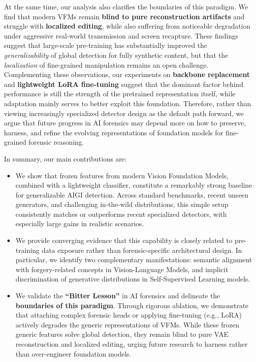 \documentclass[sigconf,screen]{acmart}
\theoremstyle{plain}
\theoremstyle{definition}
\theoremstyle{remark}
\begin{document}
At the same time, our analysis also clarifies the boundaries of this paradigm. We find that modern VFMs remain \textbf{blind to pure reconstruction artifacts} and struggle with \textbf{localized editing}, while also suffering from noticeable degradation under aggressive real-world transmission and screen recapture. These findings suggest that large-scale pre-training has substantially improved the \textit{generalizability} of global detection for fully synthetic content, but that the \textit{localization} of fine-grained manipulation remains an open challenge. Complementing these observations, our experiments on \textbf{backbone replacement} and \textbf{lightweight LoRA fine-tuning} suggest that the dominant factor behind performance is still the strength of the pretrained representation itself, while adaptation mainly serves to better exploit this foundation. Therefore, rather than viewing increasingly specialized detector design as the default path forward, we argue that future progress in AI forensics may depend more on how to preserve, harness, and refine the evolving representations of foundation models for fine-grained forensic reasoning.

In summary, our main contributions are:
\begin{itemize}
\item We show that frozen features from modern Vision Foundation Models, combined with a lightweight classifier, constitute a remarkably strong baseline for generalizable AIGI detection. Across standard benchmarks, recent unseen generators, and challenging in-the-wild distributions, this simple setup consistently matches or outperforms recent specialized detectors, with especially large gains in realistic scenarios.
\item We provide converging evidence that this capability is closely related to pre-training data exposure rather than forensic-specific architectural design. In particular, we identify two complementary manifestations: semantic alignment with forgery-related concepts in Vision-Language Models, and implicit discrimination of generative distributions in Self-Supervised Learning models.
\item We validate the \textbf{``Bitter Lesson''} in AI forensics and delineate the \textbf{boundaries of this paradigm}. Through rigorous ablation, we demonstrate that attaching complex forensic heads or applying fine-tuning (e.g., LoRA) actively degrades the generic representations of VFMs. While these frozen generic features solve global detection, they remain blind to pure VAE reconstruction and localized editing, urging future research to harness rather than over-engineer foundation models.
\end{itemize}
\end{document}
